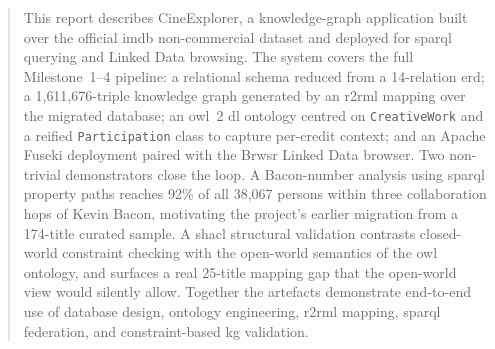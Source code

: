 \begin{abstract}
This report describes CineExplorer, a knowledge-graph application built over the official \ac{imdb} non-commercial dataset and deployed for \ac{sparql} querying and Linked Data browsing. The system covers the full Milestone~1--4 pipeline: a relational schema reduced from a 14-relation \ac{erd}; a 1{,}611{,}676-triple knowledge graph generated by an \ac{r2rml} mapping over the migrated database; an \ac{owl}~2 \ac{dl} ontology centred on \texttt{CreativeWork} and a reified \texttt{Participation} class to capture per-credit context; and an Apache Fuseki deployment paired with the Brwsr Linked Data browser. Two non-trivial demonstrators close the loop. A Bacon-number analysis using \ac{sparql} property paths reaches 92\% of all 38{,}067 persons within three collaboration hops of Kevin Bacon, motivating the project's earlier migration from a 174-title curated sample. A \ac{shacl} structural validation contrasts closed-world constraint checking with the open-world semantics of the \ac{owl} ontology, and surfaces a real 25-title mapping gap that the open-world view would silently allow. Together the artefacts demonstrate end-to-end use of database design, ontology engineering, \ac{r2rml} mapping, \ac{sparql} federation, and constraint-based \ac{kg} validation.
\end{abstract}
